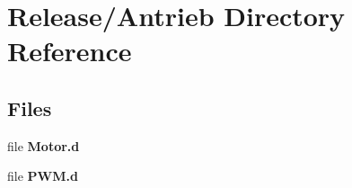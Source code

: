 \section{Release/\+Antrieb Directory Reference}
\label{dir_338333042c542b6bc0256bd4a779f407}
\subsection*{Files}
\begin{DoxyCompactItemize}
\item 
file {\bfseries Motor.\+d}
\item 
file {\bfseries P\+W\+M.\+d}
\end{DoxyCompactItemize}
